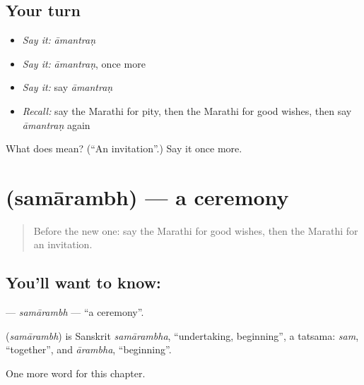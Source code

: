 \subsection*{Your turn}
\begin{itemize}
\raggedright
  \item \emph{Say it:} \emph{āmantraṇ}
  \item \emph{Say it:} \emph{āmantraṇ}, once more
  \item \emph{Say it:} say \emph{āmantraṇ}
  \item \emph{Recall:} say the Marathi for pity, then the Marathi for good wishes, then say \emph{āmantraṇ} again
\end{itemize}

\begin{tcolorbox}[breakable,colback=teal!4,colframe=teal!35!black,title={Before you move on}]
What does  mean? (\textquotedblleft{}An invitation\textquotedblright{}.) Say it once more.
\end{tcolorbox}
\section[\texorpdfstring{\mr{समारंभ} (samārambh)}{समारंभ (samārambh)}]{ (samārambh) — a ceremony}

\label{lesson:MR-C274-samarambh}



\begin{quote}
Before the new one: say the Marathi for good wishes, then the Marathi for an invitation.
\end{quote}

\subsection*{You'll want to know: }
\textbf{} — \emph{samārambh} — \textquotedblleft{}a ceremony\textquotedblright{}.

\begin{cousinweb}
\textbf{} (\emph{samārambh}) is Sanskrit \emph{samārambha}, \textquotedblleft{}undertaking, beginning\textquotedblright{}, a tatsama: \emph{sam}, \textquotedblleft{}together\textquotedblright{}, and \emph{ārambha}, \textquotedblleft{}beginning\textquotedblright{}.
\end{cousinweb}

\begin{grammarlens}[title={What you've built}]
One more word for this chapter.
\end{grammarlens}

